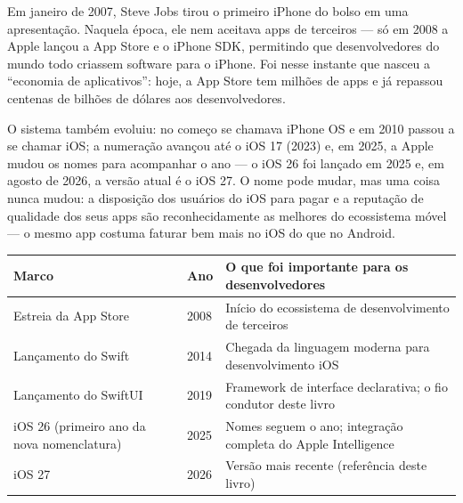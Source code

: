 


Em janeiro de 2007, Steve Jobs tirou o primeiro iPhone do bolso em uma apresentação. Naquela época, ele nem aceitava apps de terceiros — só em 2008 a Apple lançou a App Store e o iPhone SDK, permitindo que desenvolvedores do mundo todo criassem software para o iPhone. Foi nesse instante que nasceu a “economia de aplicativos”: hoje, a App Store tem milhões de apps e já repassou centenas de bilhões de dólares aos desenvolvedores.

O sistema também evoluiu: no começo se chamava iPhone OS e em 2010 passou a se chamar iOS; a numeração avançou até o iOS 17 (2023) e, em 2025, a Apple mudou os nomes para acompanhar o ano — o iOS 26 foi lançado em 2025 e, em agosto de 2026, a versão atual é o iOS 27. O nome pode mudar, mas uma coisa nunca mudou: a disposição dos usuários do iOS para pagar e a reputação de qualidade dos seus apps são reconhecidamente as melhores do ecossistema móvel — o mesmo app costuma faturar bem mais no iOS do que no Android.

\begin{center}
\begin{tabularx}{\linewidth}{|X|X|X|}
\hline
\textbf{Marco} & \textbf{Ano} & \textbf{O que foi importante para os desenvolvedores} \tabularnewline
\hline
Estreia da App Store & 2008 & Início do ecossistema de desenvolvimento de terceiros \tabularnewline
Lançamento do Swift & 2014 & Chegada da linguagem moderna para desenvolvimento iOS \tabularnewline
Lançamento do SwiftUI & 2019 & Framework de interface declarativa; o fio condutor deste livro \tabularnewline
iOS 26 (primeiro ano da nova nomenclatura) & 2025 & Nomes seguem o ano; integração completa do Apple Intelligence \tabularnewline
iOS 27 & 2026 & Versão mais recente (referência deste livro) \tabularnewline
\hline
\end{tabularx}
\end{center}

